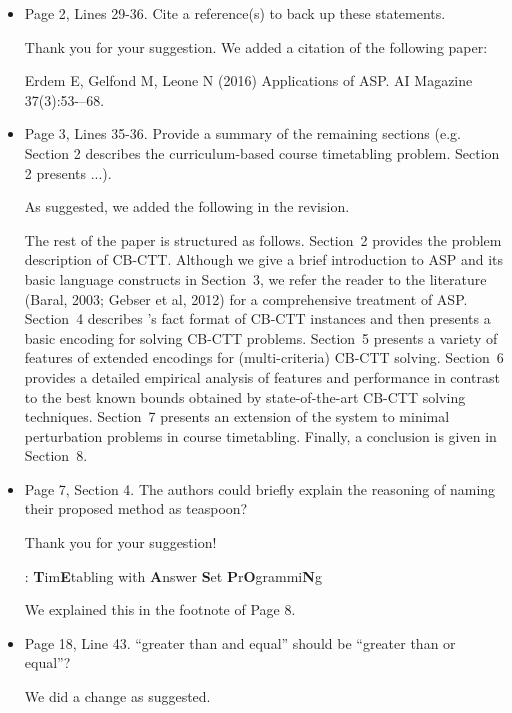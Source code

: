 \documentclass[a4j]{article}
\begin{document}
\begin{itemize}
\item 
  \begin{it}\color{blue}
  Page 2, Lines 29-36. Cite a reference(s) to back up these statements.
  \end{it}

  Thank you for your suggestion.
  We added a citation of the following paper:

  \begin{it}%
    Erdem E, Gelfond M, Leone N (2016) Applications of ASP. AI Magazine 37(3):53-–68.        
  \end{it}

\item 
  \begin{it}\color{blue}
  Page 3, Lines 35-36. Provide a summary of the remaining sections
  (e.g. Section 2 describes the curriculum-based course timetabling
  problem. Section 2 presents ...).
  \end{it}

  As suggested, we added the following in the revision.

  \begin{it}
The rest of the paper is structured as follows.
Section~2 provides the problem description of CB-CTT\@.
Although we give a brief introduction to ASP and its basic language
constructs in Section~3,
we refer the reader to the literature
(Baral, 2003; Gebser et al, 2012) 
for a comprehensive treatment of ASP\@.
Section~4
describes {\asap}'s fact format of CB-CTT instances and then 
presents a basic {\asap} encoding for solving CB-CTT problems.
Section~5 presents a variety of features of
extended {\asap} encodings for (multi-criteria) CB-CTT solving.
Section~6 provides a detailed empirical analysis of {\asap}
features and performance in contrast to 
the best known bounds obtained by state-of-the-art CB-CTT solving techniques.
Section~7 presents an extension of the {\asap} system to 
minimal perturbation problems in course timetabling. 
Finally, a conclusion is given in Section~8.
  \end{it}


\item 
  \begin{it}\color{blue}
  Page 7, Section 4. The authors could briefly explain the
  reasoning of naming their proposed method as teaspoon?
  \end{it}

  Thank you for your suggestion!

{\asap}: \textbf{T}im\textbf{E}tabling with \textbf{A}nswer \textbf{S}et \textbf{P}r\textbf{O}grammi\textbf{N}g

We explained this in the footnote of Page 8.

\item 
  \begin{it}\color{blue}
  Page 18, Line 43. ``greater than and equal'' should be ``greater than or equal''?
  \end{it}

We did a change as suggested.

\end{itemize}
\end{document}
